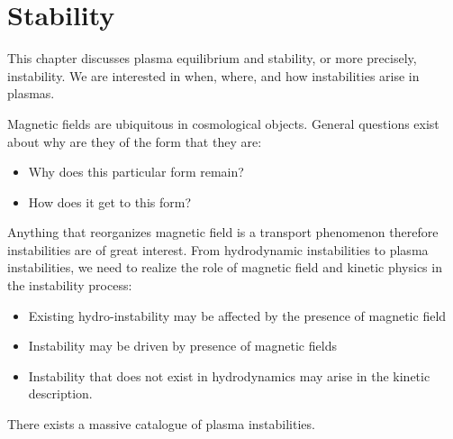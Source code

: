 \documentclass[
  notoc %
]{tufte-book}
\providecommand{\tightlist}{%
  \setlength{\itemsep}{0pt}\setlength{\parskip}{0pt}
}
\begin{document}
\hypertarget{sec:stability}{%
\chapter{Stability}\label{sec:stability}}

This chapter discusses plasma equilibrium and stability, or more
precisely, instability. We are interested in when, where, and how
instabilities arise in plasmas.

Magnetic fields are ubiquitous in cosmological objects. General
questions exist about why are they of the form that they are:

\begin{itemize}
\tightlist
\item
  Why does this particular form remain?
\item
  How does it get to this form?
\end{itemize}

Anything that reorganizes magnetic field is a transport phenomenon
therefore instabilities are of great interest. From hydrodynamic
instabilities to plasma instabilities, we need to realize the role of
magnetic field and kinetic physics in the instability process:

\begin{itemize}
\tightlist
\item
  Existing hydro-instability may be affected by the presence of magnetic
  field
\item
  Instability may be driven by presence of magnetic fields
\item
  Instability that does not exist in hydrodynamics may arise in the
  kinetic description.
\end{itemize}

There exists a massive catalogue of plasma instabilities.
\end{document}
